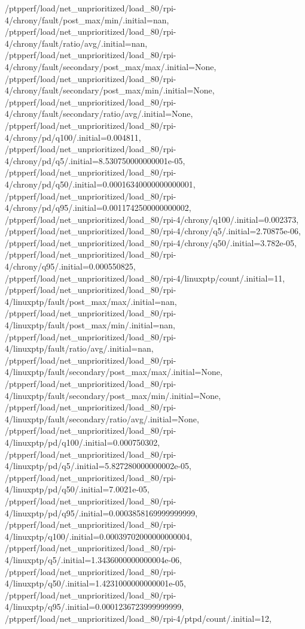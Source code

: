 {    /ptpperf/load/net_unprioritized/load_80/rpi-4/chrony/fault/post_max/min/.initial=nan,
    /ptpperf/load/net_unprioritized/load_80/rpi-4/chrony/fault/ratio/avg/.initial=nan,
    /ptpperf/load/net_unprioritized/load_80/rpi-4/chrony/fault/secondary/post_max/max/.initial=None,
    /ptpperf/load/net_unprioritized/load_80/rpi-4/chrony/fault/secondary/post_max/min/.initial=None,
    /ptpperf/load/net_unprioritized/load_80/rpi-4/chrony/fault/secondary/ratio/avg/.initial=None,
    /ptpperf/load/net_unprioritized/load_80/rpi-4/chrony/pd/q100/.initial=0.004811,
    /ptpperf/load/net_unprioritized/load_80/rpi-4/chrony/pd/q5/.initial=8.530750000000001e-05,
    /ptpperf/load/net_unprioritized/load_80/rpi-4/chrony/pd/q50/.initial=0.00016340000000000001,
    /ptpperf/load/net_unprioritized/load_80/rpi-4/chrony/pd/q95/.initial=0.0011742500000000002,
    /ptpperf/load/net_unprioritized/load_80/rpi-4/chrony/q100/.initial=0.002373,
    /ptpperf/load/net_unprioritized/load_80/rpi-4/chrony/q5/.initial=2.70875e-06,
    /ptpperf/load/net_unprioritized/load_80/rpi-4/chrony/q50/.initial=3.782e-05,
    /ptpperf/load/net_unprioritized/load_80/rpi-4/chrony/q95/.initial=0.000550825,
    /ptpperf/load/net_unprioritized/load_80/rpi-4/linuxptp/count/.initial=11,
    /ptpperf/load/net_unprioritized/load_80/rpi-4/linuxptp/fault/post_max/max/.initial=nan,
    /ptpperf/load/net_unprioritized/load_80/rpi-4/linuxptp/fault/post_max/min/.initial=nan,
    /ptpperf/load/net_unprioritized/load_80/rpi-4/linuxptp/fault/ratio/avg/.initial=nan,
    /ptpperf/load/net_unprioritized/load_80/rpi-4/linuxptp/fault/secondary/post_max/max/.initial=None,
    /ptpperf/load/net_unprioritized/load_80/rpi-4/linuxptp/fault/secondary/post_max/min/.initial=None,
    /ptpperf/load/net_unprioritized/load_80/rpi-4/linuxptp/fault/secondary/ratio/avg/.initial=None,
    /ptpperf/load/net_unprioritized/load_80/rpi-4/linuxptp/pd/q100/.initial=0.000750302,
    /ptpperf/load/net_unprioritized/load_80/rpi-4/linuxptp/pd/q5/.initial=5.827280000000002e-05,
    /ptpperf/load/net_unprioritized/load_80/rpi-4/linuxptp/pd/q50/.initial=7.0021e-05,
    /ptpperf/load/net_unprioritized/load_80/rpi-4/linuxptp/pd/q95/.initial=0.0003858169999999999,
    /ptpperf/load/net_unprioritized/load_80/rpi-4/linuxptp/q100/.initial=0.00039702000000000004,
    /ptpperf/load/net_unprioritized/load_80/rpi-4/linuxptp/q5/.initial=1.3436000000000004e-06,
    /ptpperf/load/net_unprioritized/load_80/rpi-4/linuxptp/q50/.initial=1.4231000000000001e-05,
    /ptpperf/load/net_unprioritized/load_80/rpi-4/linuxptp/q95/.initial=0.0001236723999999999,
    /ptpperf/load/net_unprioritized/load_80/rpi-4/ptpd/count/.initial=12,
}
